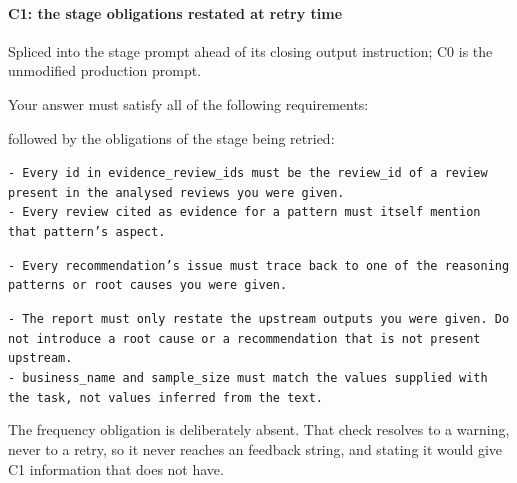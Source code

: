 \paragraph{C1: the stage obligations restated at retry time}
Spliced into the stage prompt ahead of its closing output instruction; C0 is
the unmodified production prompt.
\begin{prompttext}
Your answer must satisfy all of the following requirements:
\end{prompttext}
followed by the obligations of the stage being retried:
\begin{description}[leftmargin=1.2em,style=nextline,font=\normalfont\itshape,
                   before=\footnotesize\raggedright]
\item[Reasoning] \texttt{- Every id in evidence\_review\_ids must be the
  review\_id of a review present in the analysed reviews you were given.}\\
  \texttt{- Every review cited as evidence for a pattern must itself mention
  that pattern's aspect.}
\item[Strategy] \texttt{- Every recommendation's issue must trace back to one of
  the reasoning patterns or root causes you were given.}
\item[Report] \texttt{- The report must only restate the upstream outputs you
  were given. Do not introduce a root cause or a recommendation that is not
  present upstream.}\\
  \texttt{- business\_name and sample\_size must match the values supplied with
  the task, not values inferred from the text.}
\end{description}
\noindent The frequency obligation is deliberately absent. That check resolves
to a warning, never to a retry, so it never reaches an  feedback string,
and stating it would give C1 information that  does not have.
